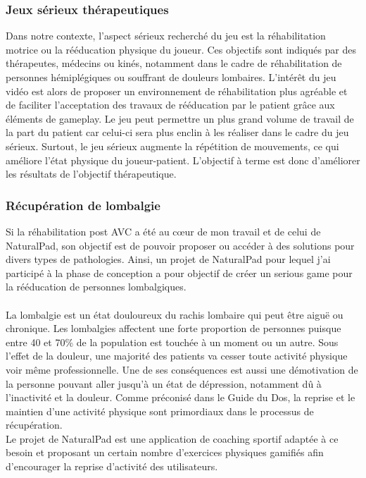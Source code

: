 	\subsubsection{Jeux sérieux thérapeutiques}
Dans notre contexte, l’aspect sérieux recherché du jeu est la réhabilitation motrice ou la rééducation physique du joueur. Ces objectifs sont indiqués par des thérapeutes, médecins ou kinés, notamment dans le cadre de réhabilitation de personnes hémiplégiques ou souffrant de douleurs lombaires. L’intérêt du jeu vidéo est alors de proposer un environnement de réhabilitation plus agréable et de faciliter l’acceptation des travaux de rééducation par le patient grâce aux éléments de gameplay. Le jeu peut permettre un plus grand volume de travail de la part du patient car celui-ci sera plus enclin à les réaliser dans le cadre du jeu sérieux. Surtout, le jeu sérieux augmente la répétition de mouvements, ce qui améliore l'état physique du joueur-patient. L’objectif à terme est donc d’améliorer les résultats de l’objectif thérapeutique.


	


	
	
	\subsubsection*{Récupération de lombalgie}
Si la réhabilitation post AVC a été au cœur de mon travail et de celui de NaturalPad, son objectif est de pouvoir proposer ou accéder à des solutions pour divers types de pathologies. Ainsi, un projet de NaturalPad pour lequel j'ai participé à la phase de conception a pour objectif de créer un serious game pour la rééducation de personnes lombalgiques.
\paragraph{}
La lombalgie est un état douloureux du rachis lombaire qui peut être aiguë ou chronique. Les lombalgies affectent une forte proportion de personnes puisque entre 40 et 70\% de la population est touchée à un moment ou un autre. Sous l'effet de la douleur, une majorité des patients va cesser toute activité physique voir même professionnelle. Une de ses conséquences est aussi une démotivation de la personne pouvant aller jusqu'à un état de dépression, notamment dû à l'inactivité et la douleur. Comme préconisé dans le Guide du Dos\cite{backbook}, la reprise et le maintien d'une activité physique sont primordiaux dans le processus de récupération. \\
Le projet de NaturalPad est une application de coaching sportif adaptée à ce besoin et proposant un certain nombre d'exercices physiques gamifiés afin d'encourager la reprise d'activité des utilisateurs.

